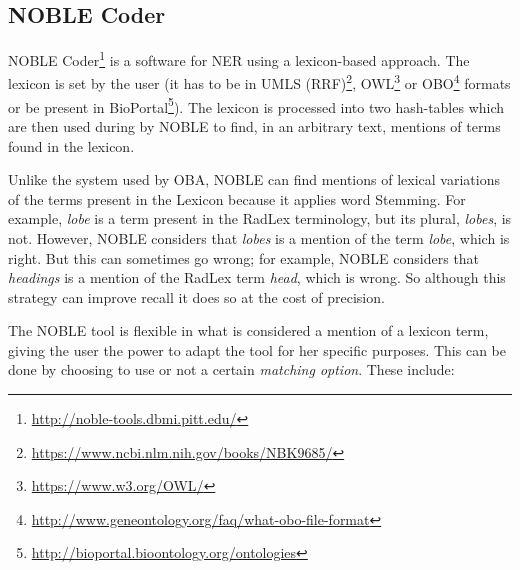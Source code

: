 \subsection{NOBLE Coder}
\label{NOBLE Coder}

NOBLE Coder\footnote{\url{http://noble-tools.dbmi.pitt.edu/}} \citep{Tseytlin2016} is a software for NER using a lexicon-based approach. The lexicon is set by the user (it  has to be in UMLS (RRF)\footnote{\url{https://www.ncbi.nlm.nih.gov/books/NBK9685/}}, OWL\footnote{\url{https://www.w3.org/OWL/}} or OBO\footnote{\url{http://www.geneontology.org/faq/what-obo-file-format}} formats or be present in BioPortal\footnote{\url{http://bioportal.bioontology.org/ontologies}}). The lexicon is processed into two hash-tables which are then used during by NOBLE to find, in an arbitrary text, mentions of terms found in the lexicon.

Unlike the system used by OBA, NOBLE can find mentions of lexical variations of the terms present in the Lexicon because it applies word Stemming. For example, \textit{lobe} is a term present in the RadLex terminology, but its plural, \textit{lobes}, is not. However, NOBLE considers that \textit{lobes} is a mention of the term \textit{lobe}, which is right. But this can sometimes go wrong; for example, NOBLE considers that \textit{headings} is a mention of the RadLex term \textit{head}, which is wrong. So although this strategy can improve recall it does so at the cost of precision.

The NOBLE tool is flexible in what is considered a mention of a lexicon term, giving the user the power to adapt the tool for her specific purposes. This can be done by choosing to use or not a certain \textit{matching option}. These include:

